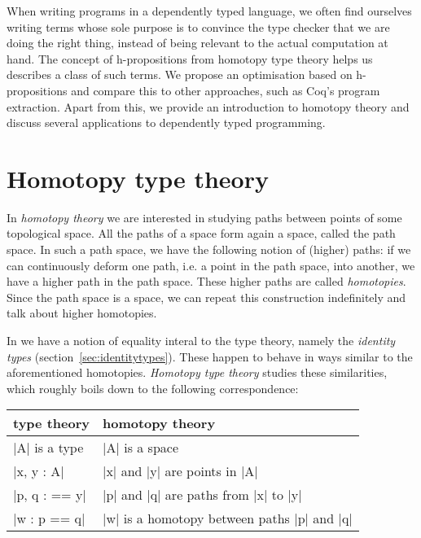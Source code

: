
When writing programs in a dependently typed language, we often find
ourselves writing terms whose sole purpose is to convince the type
checker that we are doing the right thing, instead of being relevant
to the actual computation at hand. The concept of h-propositions from
homotopy type theory helps us describes a class of such terms. We
propose an optimisation based on h-propositions and compare this to
other approaches, such as Coq's program extraction. Apart from this,
we provide an introduction to homotopy theory and discuss several
applications to dependently typed programming.

\section{Homotopy type theory}
\label{sec:hott}

In \emph{homotopy theory} we are interested in studying paths between
points of some topological space. All the paths of a space form again
a space, called the path space. In such a path space, we have the
following notion of (higher) paths: if we can continuously deform one
path, i.e. a point in the path space, into another, we have a higher
path in the path space. These higher paths are called
\emph{homotopies}. Since the path space is a space, we can repeat this
construction indefinitely and talk about higher homotopies.

In \MLTT we have a notion of equality interal to the type theory,
namely the \emph{identity types}
(section~\ref{sec:identitytypes}). These happen to behave in ways
similar to the aforementioned homotopies. \emph{Homotopy type theory}
studies these similarities, which roughly boils down to the following
correspondence:

\begin{center}
\begin{tabular}{||l||l||}
\hline
 \textbf{type theory}  &  \textbf{homotopy theory}  \\
\hline
 |A| is a type      &  |A| is a space                              \\
 |x, y : A|         &  |x| and |y| are points in |A|               \\
 |p, q : == y|      &  |p| and |q| are paths from |x| to |y|       \\
 |w : p == q|       &  |w| is a homotopy between paths |p| and |q| \\
\hline
\end{tabular}
\end{center}

